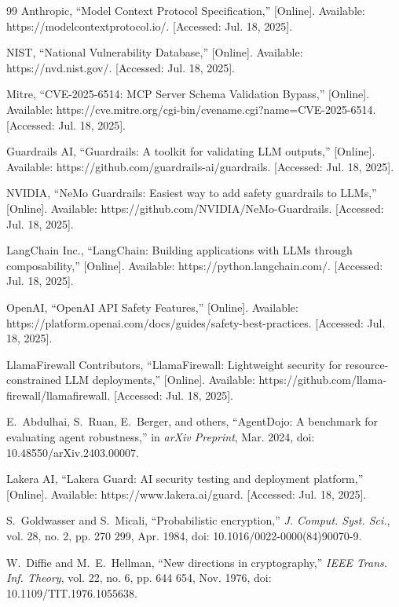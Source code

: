 \documentclass[12pt,twocolumn,journal]{IEEEtran}
\begin{document}
\begin{thebibliography}{99}
Anthropic, ``Model Context Protocol Specification,'' [Online]. Available: https://modelcontextprotocol.io/. [Accessed: Jul. 18, 2025].

NIST, ``National Vulnerability Database,'' [Online]. Available: https://nvd.nist.gov/. [Accessed: Jul. 18, 2025].

Mitre, ``CVE-2025-6514: MCP Server Schema Validation Bypass,'' [Online]. Available: https://cve.mitre.org/cgi-bin/cvename.cgi?name=CVE-2025-6514. [Accessed: Jul. 18, 2025].

Guardrails AI, ``Guardrails: A toolkit for validating LLM outputs,'' [Online]. Available: https://github.com/guardrails-ai/guardrails. [Accessed: Jul. 18, 2025].

NVIDIA, ``NeMo Guardrails: Easiest way to add safety guardrails to LLMs,'' [Online]. Available: https://github.com/NVIDIA/NeMo-Guardrails. [Accessed: Jul. 18, 2025].

LangChain Inc., ``LangChain: Building applications with LLMs through composability,'' [Online]. Available: https://python.langchain.com/. [Accessed: Jul. 18, 2025].

OpenAI, ``OpenAI API Safety Features,'' [Online]. Available: https://platform.openai.com/docs/guides/safety-best-practices. [Accessed: Jul. 18, 2025].

LlamaFirewall Contributors, ``LlamaFirewall: Lightweight security for resource-constrained LLM deployments,'' [Online]. Available: https://github.com/llama-firewall/llamafirewall. [Accessed: Jul. 18, 2025].

E.~Abdulhai, S.~Ruan, E.~Berger, and others, ``AgentDojo: A benchmark for evaluating agent robustness,'' in \emph{arXiv Preprint}, Mar. 2024, doi: 10.48550/arXiv.2403.00007.

Lakera AI, ``Lakera Guard: AI security testing and deployment platform,'' [Online]. Available: https://www.lakera.ai/guard. [Accessed: Jul. 18, 2025].


S.~Goldwasser and S.~Micali, ``Probabilistic encryption,'' \emph{J. Comput. Syst. Sci.}, vol. 28, no. 2, pp. 270 299, Apr. 1984, doi: 10.1016/0022-0000(84)90070-9.

W.~Diffie and M.~E.~Hellman, ``New directions in cryptography,'' \emph{IEEE Trans. Inf. Theory}, vol. 22, no. 6, pp. 644 654, Nov. 1976, doi: 10.1109/TIT.1976.1055638.


\end{thebibliography}
\end{document}
